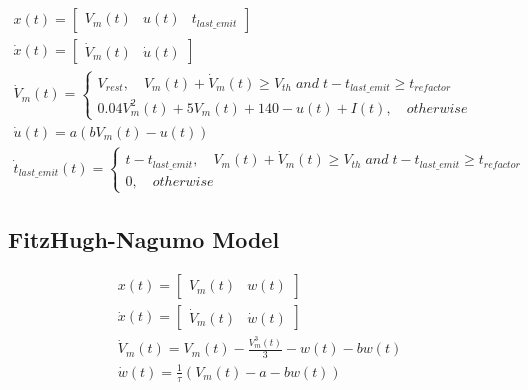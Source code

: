 \begin{align}
    x(t) = \begin{bmatrix}V_m(t) & u(t) & t_{last\_emit}\end{bmatrix} \label{eq:smm-izhikevich-1} \\
    \dot x(t) = \begin{bmatrix}\dot V_m(t) & \dot u(t)\end{bmatrix} \label{eq:smm-izhikevich-2} \\
    \dot V_m(t) = 
    \begin{cases}
    V_{rest},  \quad V_m(t) + \dot V_m(t) \ge V_{th}\;and\;t-t_{last\_emit}\ge t_{refactor} \\
    0.04V_m^2(t) + 5V_m(t) + 140 - u(t) + I(t), \quad otherwise
    \end{cases}\label{eq:smm-izhikevich-3} \\
    \dot u(t) = a(bV_m(t) - u(t))  \label{eq:smm-izhikevich-4} \\
    \dot t_{last\_emit}(t) = \begin{cases}
        t-t_{last\_emit}, \quad V_m(t) + \dot V_m(t) \ge V_{th}\;and\;t-t_{last\_emit}\ge t_{refactor} \\
        0,\quad otherwise
    \end{cases} \label{eq:smm-izhikevich-5}
\end{align}


\subsection{FitzHugh-Nagumo Model}

\begin{align}
    x(t) = \begin{bmatrix}V_m(t) & w(t)\end{bmatrix} \label{eq:smm-fn-1} \\
    \dot x(t) = \begin{bmatrix}\dot V_m(t) & \dot w(t)\end{bmatrix} \label{eq:smm-fn-2} \\
    \dot V_m(t) = V_m(t) - \frac{V_m^3(t)}{3} - w(t)- bw(t)\label{eq:smm-fn-3} \\
    \dot w(t) = \frac{1}{\tau}(V_m(t) - a -bw(t))\label{eq:smm-fn-3}
\end{align}

